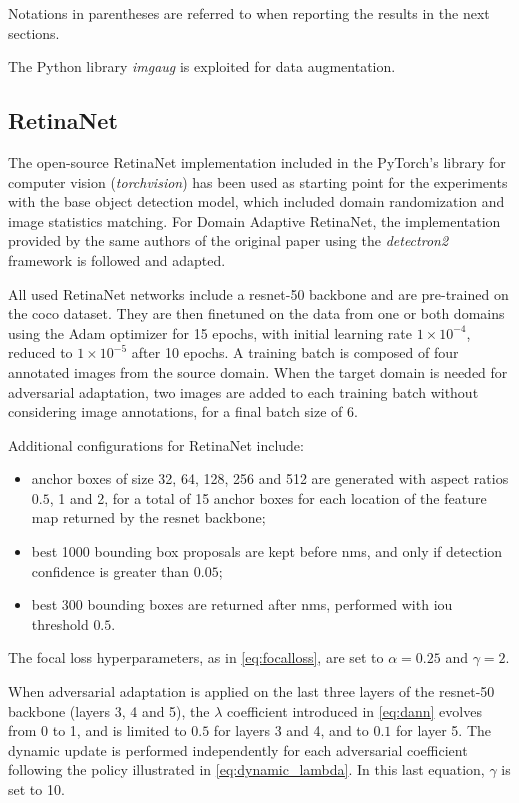 \documentclass[%
    corpo=12pt,
    twoside,
    stile=classica,   
    tipotesi=magistrale,
    evenboxes,
    english,
	numerazioneromana,
]{toptesi}
\begin{document}
Notations in parentheses are referred to when reporting the results in the next sections.

\bigskip
The Python library \textit{imgaug}\cite{imgaug} is exploited for data augmentation.

\subsection{RetinaNet}
The open-source RetinaNet implementation included in the PyTorch's library for computer vision (\textit{torchvision})\cite{torchvision_retinanet} has been used as starting point for the experiments with the base object detection model, which included domain randomization and image statistics matching. For Domain Adaptive RetinaNet, the implementation provided by the same authors of the original paper\cite{pasqualino2020unsupervised} using the \textit{detectron2} framework\cite{wu2019detectron2}\cite{daretinanet_github} is followed and adapted.

\bigskip
All used RetinaNet networks include a \gls{resnet}-50 backbone and are pre-trained on the \gls{coco} dataset. They are then finetuned on the data from one or both domains using the Adam optimizer for 15 epochs, with initial learning rate $1\times 10^{-4}$, reduced to $1\times 10^{-5}$ after 10 epochs. A training batch is composed of four annotated images from the source domain. When the target domain is needed for adversarial adaptation, two images are added to each training batch without considering image annotations, for a final batch size of 6.

\medskip
Additional configurations for RetinaNet include:
\begin{itemize}
	\item anchor boxes of size 32, 64, 128, 256 and 512 are generated with aspect ratios $0.5$, 1 and 2, for a total of 15 anchor boxes for each location of the feature map returned by the \gls{resnet} backbone;
	\item best 1000 bounding box proposals are kept before \gls{nms}, and only if detection confidence is greater than $0.05$;
	\item best 300 bounding boxes are returned after \gls{nms}, performed with \gls{iou} threshold $0.5$.
\end{itemize}

The focal loss hyperparameters, as in \eqref{eq:focalloss}, are set to $\alpha = 0.25$ and $\gamma = 2$.

When adversarial adaptation is applied on the last three layers of the \gls{resnet}-50 backbone (layers 3, 4 and 5), the $\lambda$ coefficient introduced in \eqref{eq:dann} evolves from 0 to 1, and is limited to $0.5$ for layers 3 and 4, and to $0.1$ for layer 5. The dynamic update is performed independently for each adversarial coefficient following the policy illustrated in \eqref{eq:dynamic_lambda}. In this last equation, $\gamma$ is set to 10.
\end{document}
